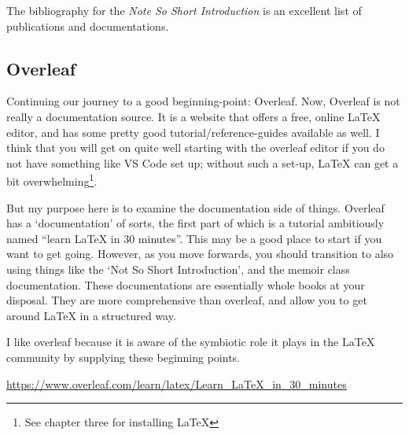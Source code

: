 \documentclass[11pt, oneside]{memoir}
\begin{document}
The bibliography for the \emph{Note So Short Introduction} is an excellent list of publications and documentations.

\subsection{Overleaf}

Continuing our journey to a good beginning-point: Overleaf. Now, Overleaf is not really a documentation source. It is a website that offers a free, online LaTeX editor, and has some pretty good tutorial/reference-guides available as well. I think that you will get on quite well starting with the overleaf editor if you do not have something like VS Code set up; without such a set-up, LaTeX can get a bit overwhelming\footnote{See chapter three for installing LaTeX}.

But my purpose here is to examine the documentation side of things. Overleaf has a `documentation' of sorts, the first part of which is a tutorial ambitiously named ``learn LaTeX in 30 minutes''. This may be a good place to start if you want to get going. However, as you move forwards, you should transition to also using things like the `Not So Short Introduction', and the memoir class documentation. These documentations are essentially whole books at your disposal. They are more comprehensive than overleaf, and allow you to get around LaTeX in a structured way.

I like overleaf because it is aware of the symbiotic role it plays in the LaTeX community by supplying these beginning points.

\url{https://www.overleaf.com/learn/latex/Learn_LaTeX_in_30_minutes}
\end{document}
